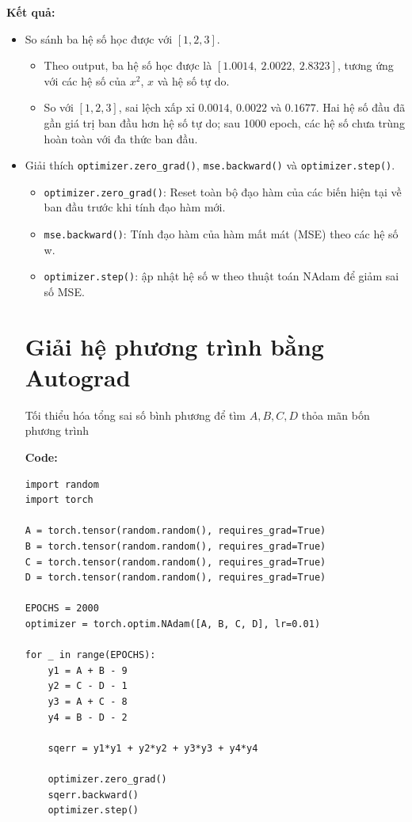 \documentclass[12pt,a4paper]{article}
\begin{document}
\textbf{Kết quả:}
\begin{itemize}
    \item So sánh ba hệ số học được với $[1,2,3]$.

    \begin{itemize}
        \item Theo output, ba hệ số học được là $[1.0014,\ 2.0022,\ 2.8323]$, tương ứng với các hệ số của $x^2$, $x$ và hệ số tự do.
        \item So với $[1,2,3]$, sai lệch xấp xỉ $0.0014$, $0.0022$ và $0.1677$. Hai hệ số đầu đã gần giá trị ban đầu hơn hệ số tự do; sau 1000 epoch, các hệ số chưa trùng hoàn toàn với đa thức ban đầu.
    \end{itemize}

    \item Giải thích \texttt{optimizer.zero\_grad()}, \texttt{mse.backward()} và \texttt{optimizer.step()}.
    \begin{itemize}
        \item \texttt{optimizer.zero\_grad()}: Reset toàn bộ đạo hàm của các biến hiện tại về ban đầu trước khi tính đạo hàm mới.
        \item \texttt{mse.backward()}: Tính đạo hàm của hàm mất mát (MSE) theo các hệ số w. 
        \item \texttt{optimizer.step()}: ập nhật hệ số w theo thuật toán NAdam để giảm sai số MSE.
\end{itemize}


\section{Giải hệ phương trình bằng Autograd}
Tối thiểu hóa tổng sai số bình phương để tìm $A,B,C,D$ thỏa mãn bốn phương trình

\textbf{Code:}
\begin{verbatim}
import random
import torch

A = torch.tensor(random.random(), requires_grad=True)
B = torch.tensor(random.random(), requires_grad=True)
C = torch.tensor(random.random(), requires_grad=True)
D = torch.tensor(random.random(), requires_grad=True)

EPOCHS = 2000
optimizer = torch.optim.NAdam([A, B, C, D], lr=0.01)

for _ in range(EPOCHS):
    y1 = A + B - 9
    y2 = C - D - 1
    y3 = A + C - 8
    y4 = B - D - 2

    sqerr = y1*y1 + y2*y2 + y3*y3 + y4*y4

    optimizer.zero_grad()
    sqerr.backward()
    optimizer.step()


\end{verbatim}
\end{itemize}
\end{document}
